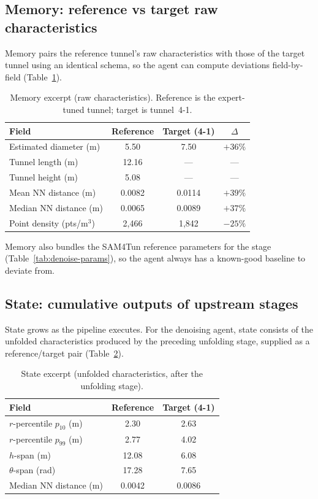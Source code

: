 \subsection{Memory: reference vs target raw characteristics}\label{app:context-memory}
Memory pairs the reference tunnel's raw characteristics with those of the target tunnel using an identical schema, so the agent can compute deviations field-by-field (Table~\ref{tab:context-memory}).

\begin{table}[ht]
\caption{Memory excerpt (raw characteristics). Reference is the expert-tuned tunnel; target is tunnel~4-1.}\label{tab:context-memory}
\begin{tabular*}{\tblwidth}{@{} l c c c @{}}
\toprule
Field & Reference & Target (4-1) & $\Delta$ \\
\midrule
Estimated diameter (m) & 5.50 & 7.50 & $+36\%$ \\
Tunnel length (m) & 12.16 & --- & --- \\
Tunnel height (m) & 5.08 & --- & --- \\
Mean NN distance (m) & 0.0082 & 0.0114 & $+39\%$ \\
Median NN distance (m) & 0.0065 & 0.0089 & $+37\%$ \\
Point density (pts/m$^3$) & 2{,}466 & 1{,}842 & $-25\%$ \\
\bottomrule
\end{tabular*}
\end{table}

Memory also bundles the SAM4Tun reference parameters for the stage (Table~\ref{tab:denoise-params}), so the agent always has a known-good baseline to deviate from.

\subsection{State: cumulative outputs of upstream stages}\label{app:context-state}
State grows as the pipeline executes. For the denoising agent, state consists of the unfolded characteristics produced by the preceding unfolding stage, supplied as a reference/target pair (Table~\ref{tab:context-state}).

\begin{table}[ht]
\caption{State excerpt (unfolded characteristics, after the unfolding stage).}\label{tab:context-state}
\begin{tabular*}{\tblwidth}{@{} l c c @{}}
\toprule
Field & Reference & Target (4-1) \\
\midrule
$r$-percentile $p_{10}$ (m) & 2.30 & 2.63 \\
$r$-percentile $p_{99}$ (m) & 2.77 & 4.02 \\
$h$-span (m) & 12.08 & 6.08 \\
$\theta$-span (rad) & 17.28 & 7.65 \\
Median NN distance (m) & 0.0042 & 0.0086 \\
\bottomrule
\end{tabular*}
\end{table}


